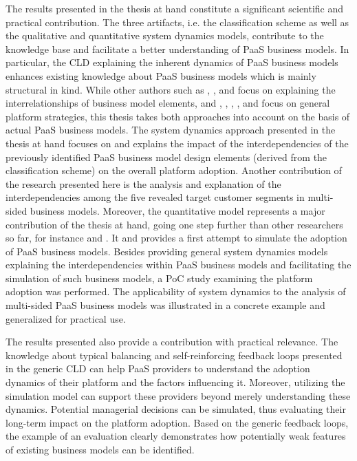 The results presented in the thesis at hand constitute a significant scientific and practical contribution. The three artifacts, i.e. the classification scheme as well as the qualitative and quantitative system dynamics models, contribute to the knowledge base and facilitate a better understanding of \ac{PaaS} business models. In particular, the \ac{CLD} explaining the inherent dynamics of \ac{PaaS} business models enhances existing knowledge about \ac{PaaS} business models which is mainly structural in kind. While other authors such as \citet{BenLagha2001}, \citet{Klueber2000}, and \citet{Kiani2009} focus on explaining the interrelationships of business model elements, and \citet{Cusumano2010}, \citet{Gawer2008}, \citet{Cusumano2002}, \citet{Eisenmann2006}, and \citet{Beimborn2011} focus on general platform strategies, this thesis takes both approaches into account on the basis of actual \ac{PaaS} business models. The system dynamics approach presented in the thesis at hand focuses on and explains the impact of the interdependencies of the previously identified \ac{PaaS} business model design elements (derived from the classification scheme) on the overall platform adoption. Another contribution of the research presented here is the analysis and explanation of the interdependencies among the five revealed target customer segments in multi-sided business models. Moreover, the quantitative model represents a major contribution of the thesis at hand, going one step further than other researchers so far, for instance \citet{Klueber2000} and \citet{Kiani2009}. It and provides a first attempt to simulate the adoption of \ac{PaaS} business models. Besides providing general system dynamics models explaining the interdependencies within \ac{PaaS} business models and facilitating the simulation of such business models, a \acf{PoC} study examining the platform adoption was performed. The applicability of system dynamics to the analysis of multi-sided \ac{PaaS} business models was illustrated in a concrete example and generalized for practical use.

The results presented also provide a contribution with practical relevance. The knowledge about typical balancing and self-reinforcing feedback loops presented in the generic \ac{CLD} can help \ac{PaaS} providers to understand the adoption dynamics of their platform and the factors influencing it. Moreover, utilizing the simulation model can support these providers beyond merely understanding these dynamics. Potential managerial decisions can be simulated, thus evaluating their long-term impact on the platform adoption. Based on the generic feedback loops, the example of an evaluation clearly demonstrates how potentially weak features of existing business models can be identified.

